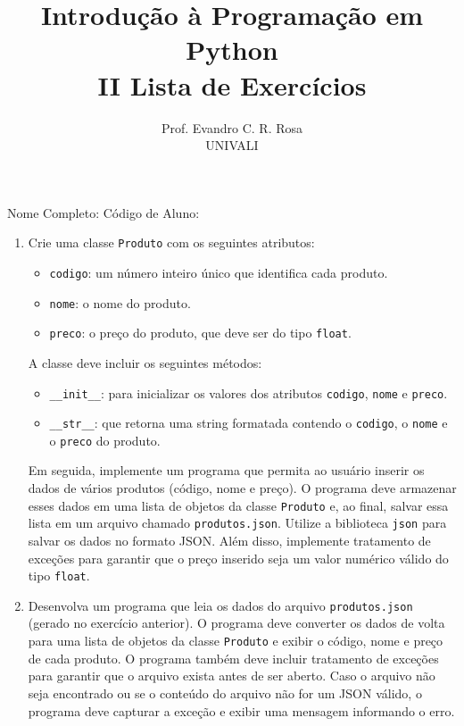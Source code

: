 \documentclass[12pt]{article}
\title{Introdução à Programação em Python\\
\large II Lista de Exercícios}
\author{Prof. Evandro C. R. Rosa\\UNIVALI}
\date{}
\begin{document}
\maketitle

\noindent Nome Completo: \underline{\hspace{8cm}} Código de Aluno: \underline{\hspace{2.4cm}}

\begin{enumerate}

  \item Crie uma classe \texttt{Produto} com os seguintes atributos:
    \begin{itemize}
      \item \texttt{codigo}: um número inteiro único que identifica cada produto.
      \item \texttt{nome}: o nome do produto.
      \item \texttt{preco}: o preço do produto, que deve ser do tipo \texttt{float}.
    \end{itemize}
    A classe deve incluir os seguintes métodos:
    \begin{itemize}
      \item \texttt{\_\_init\_\_}: para inicializar os valores dos atributos \texttt{codigo}, \texttt{nome} e \texttt{preco}.
      \item \texttt{\_\_str\_\_}: que retorna uma string formatada contendo o \texttt{codigo}, o \texttt{nome} e o \texttt{preco} do produto.
    \end{itemize}

    Em seguida, implemente um programa que permita ao usuário inserir os dados de vários produtos (código, nome e preço). O programa deve armazenar esses dados em uma lista de objetos da classe \texttt{Produto} e, ao final, salvar essa lista em um arquivo chamado \texttt{produtos.json}. Utilize a biblioteca \texttt{json} para salvar os dados no formato JSON. Além disso, implemente tratamento de exceções para garantir que o preço inserido seja um valor numérico válido do tipo \texttt{float}.

  \item Desenvolva um programa que leia os dados do arquivo \texttt{produtos.json} (gerado no exercício anterior). O programa deve converter os dados de volta para uma lista de objetos da classe \texttt{Produto} e exibir o código, nome e preço de cada produto. O programa também deve incluir tratamento de exceções para garantir que o arquivo exista antes de ser aberto. Caso o arquivo não seja encontrado ou se o conteúdo do arquivo não for um JSON válido, o programa deve capturar a exceção e exibir uma mensagem informando o erro.


\end{enumerate}
\end{document}
